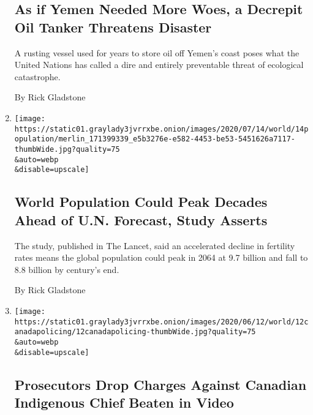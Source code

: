 \begin{enumerate}
  \hypertarget{as-if-yemen-needed-more-woes-a-decrepit-oil-tanker-threatens-disaster}{%
  \subsection{As if Yemen Needed More Woes, a Decrepit Oil Tanker
  Threatens
  Disaster}\label{as-if-yemen-needed-more-woes-a-decrepit-oil-tanker-threatens-disaster}}

  A rusting vessel used for years to store oil off Yemen's coast poses
  what the United Nations has called a dire and entirely preventable
  threat of ecological catastrophe.

  By Rick Gladstone
\item
  \href{/2020/07/14/world/americas/global-population-trends.html}{}

  \texttt{[image: https://static01.graylady3jvrrxbe.onion/images/2020/07/14/world/14population/merlin\_171399339\_e5b3276e-e582-4453-be53-5451626a7117-thumbWide.jpg?quality=75\\\&auto=webp\\\&disable=upscale]}

  \hypertarget{world-population-could-peak-decades-ahead-of-un-forecast-study-asserts}{%
  \subsection{World Population Could Peak Decades Ahead of U.N.
  Forecast, Study
  Asserts}\label{world-population-could-peak-decades-ahead-of-un-forecast-study-asserts}}

  The study, published in The Lancet, said an accelerated decline in
  fertility rates means the global population could peak in 2064 at 9.7
  billion and fall to 8.8 billion by century's end.

  By Rick Gladstone
\item
  \href{/2020/06/24/world/canada/canada-allan-adam-indigenous.html}{}

  \texttt{[image: https://static01.graylady3jvrrxbe.onion/images/2020/06/12/world/12canadapolicing/12canadapolicing-thumbWide.jpg?quality=75\\\&auto=webp\\\&disable=upscale]}

  \hypertarget{prosecutors-drop-charges-against-canadian-indigenous-chief-beaten-in-video}{%
  \subsection{Prosecutors Drop Charges Against Canadian Indigenous Chief
  Beaten in
  Video}\label{prosecutors-drop-charges-against-canadian-indigenous-chief-beaten-in-video}}


\end{enumerate}
